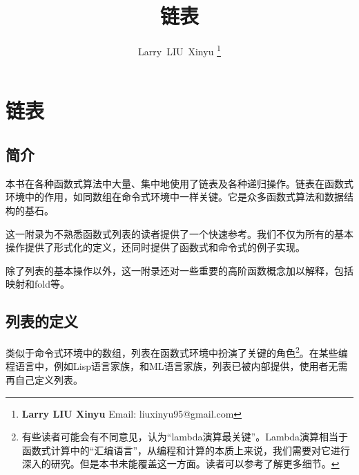 \documentclass[UTF8]{article}
\begin{document}


\title{链表}

\author{Larry~LIU~Xinyu
\thanks{{\bfseries Larry LIU Xinyu } \newline
  Email: liuxinyu95@gmail.com \newline}
  }

\maketitle
\fi


\ifx\wholebook\relax
\chapter{链表}
\fi

\section{简介}
\label{introduction}

本书在各种函数式算法中大量、集中地使用了链表及各种递归操作。链表在函数式环境中的作用，如同数组在命令式环境中一样关键。它是众多函数式算法和数据结构的基石。

这一附录为不熟悉函数式列表的读者提供了一个快速参考。我们不仅为所有的基本操作提供了形式化的定义，还同时提供了函数式和命令式的例子实现。

除了列表的基本操作以外，这一附录还对一些重要的高阶函数概念加以解释，包括映射和fold等。


\section{列表的定义}

类似于命令式环境中的数组，列表在函数式环境中扮演了关键的角色\footnote{有些读者可能会有不同意见，认为“lambda演算最关键”。Lambda演算相当于函数式计算中的“汇编语言”，从编程和计算的本质上来说，我们需要对它进行深入的研究。但是本书未能覆盖这一方面。读者可以参考\cite{mittype}了解更多细节。}。在某些编程语言中，例如Lisp语言家族，和ML语言家族，列表已被内部提供，使用者无需再自己定义列表。
\end{document}
